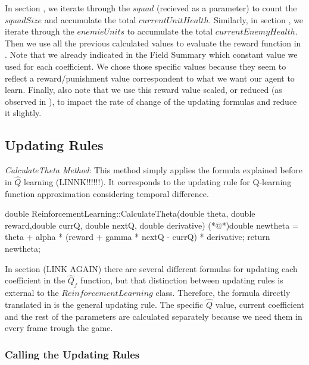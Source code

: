 In section , we iterate through the $squad$ (recieved as a parameter) to count the $squadSize$ and accumulate the total $currentUnitHealth$. Similarly, in section , we iterate through the $enemieUnits$ to accumulate the total $currentEnemyHealth$.\\

Then we use all the previous calculated values to evaluate the reward function in . Note that we already indicated in the Field Summary which constant value we used for each coefficient. We chose those specific values because they seem to reflect a reward/punishment value correspondent to what we want our agent to learn. Finally, also note that we use this reward value scaled, or reduced (as observed in ), to impact the rate of change of the updating formulas and reduce it slightly. \\

\subsection{Updating Rules}

\textit{CalculateTheta Method}: This method simply applies the formula explained before in $\hat{Q}$ learning (LINNK!!!!!!). It corresponds to the updating rule for Q-learning function approximation considering temporal difference.\\

\begin{Sourcecode}[caption=CalculateTheta Method]
double ReinforcementLearning::CalculateTheta(double theta, double reward,double currQ, double nextQ, double derivative)
{
	(*@\lnote@*)double newtheta = theta + alpha * (reward + gamma * nextQ - currQ) * derivative;
	return newtheta;
}
\end{Sourcecode}

In section (LINK AGAIN) there are several different formulas for updating each coefficient in the $\hat{Q}_f$ function, but that distinction between updating rules is external to the $ReinforcementLearning$ class. Therefore, the formula directly translated in  is the general updating rule. The specific $\hat{Q}$ value, current coefficient and the rest of the parameters are calculated separately because we need them in every frame trough the game. \\

\subsubsection{Calling the Updating Rules}

